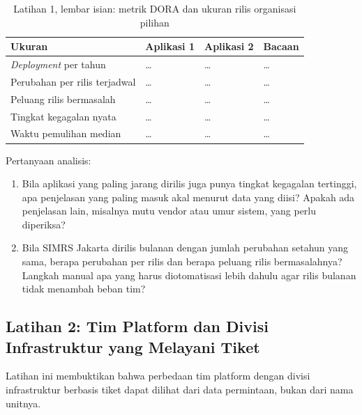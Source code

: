 \begin{table}[!htb]
  \centering
  \caption{Latihan 1, lembar isian: metrik DORA dan ukuran rilis organisasi pilihan}
  \label{tab:ch13-lat1-hasil}
  \footnotesize
  \begin{tabularx}{\textwidth}{>{\raggedright\arraybackslash}p{3.0cm} >{\raggedright\arraybackslash}p{2.0cm} >{\raggedright\arraybackslash}p{2.0cm} >{\raggedright\arraybackslash}X}
    \hline
    \textbf{Ukuran} & \textbf{Aplikasi 1} & \textbf{Aplikasi 2} & \textbf{Bacaan} \\ \hline
    \textit{Deployment} per tahun & \dots & \dots & \dots \\ \hline
    Perubahan per rilis terjadwal & \dots & \dots & \dots \\ \hline
    Peluang rilis bermasalah & \dots & \dots & \dots \\ \hline
    Tingkat kegagalan nyata & \dots & \dots & \dots \\ \hline
    Waktu pemulihan median & \dots & \dots & \dots \\ \hline
  \end{tabularx}
\end{table}

Pertanyaan analisis:
\begin{enumerate}
  \item Bila aplikasi yang paling jarang dirilis juga punya tingkat kegagalan tertinggi, apa
        penjelasan yang paling masuk akal menurut data yang diisi? Apakah ada penjelasan lain,
        misalnya mutu vendor atau umur sistem, yang perlu diperiksa?
  \item Bila SIMRS Jakarta dirilis bulanan dengan jumlah perubahan setahun yang sama, berapa
        perubahan per rilis dan berapa peluang rilis bermasalahnya? Langkah manual apa yang harus
        diotomatisasi lebih dahulu agar rilis bulanan tidak menambah beban tim?
\end{enumerate}

\subsection*{Latihan 2: Tim Platform dan Divisi Infrastruktur yang Melayani Tiket}

Latihan ini membuktikan bahwa perbedaan tim platform dengan divisi infrastruktur berbasis tiket
dapat dilihat dari data permintaan, bukan dari nama unitnya.

